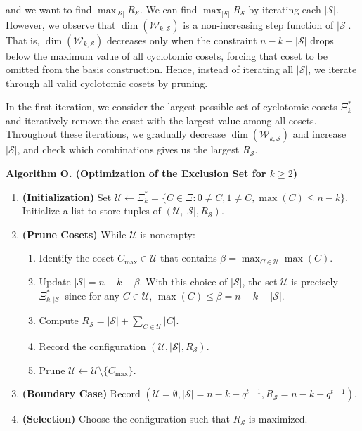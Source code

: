 \documentclass[onecolumn]{IEEEtran}
\theoremstyle{plain}
\theoremstyle{definition}
\newcommand{\cS}{\mathcal{S}}
\newcommand{\cU}{\mathcal{U}}
\newcommand{\cW}{\mathcal{W}}
\begin{document}
and we want to find $\max_{|\cS|} R_\cS$. We can find $\max_{|\cS|} R_\cS$ by iterating each $|\cS|$. However, we observe that $\dim(\cW_{k,\cS})$ is a non-increasing step function of $|\cS|$. That is, $\dim{(\cW_{k,\cS})}$ decreases only when the constraint $n-k-|\cS|$ drops below the maximum value of all cyclotomic cosets, forcing that coset to be omitted from the basis construction. Hence, instead of iterating all $|\cS|$, we iterate through all valid cyclotomic cosets by pruning. 

In the first iteration, we consider the largest possible set of cyclotomic cosets $\Xi^*_k$ and iteratively remove the coset with the largest value among all cosets. Throughout these iterations, we gradually decrease $\dim(\cW_{k,\cS})$ and increase $|\cS|$, and check which combinations gives us the largest $R_\cS$.

\noindent \textbf{Algorithm O. (Optimization of the Exclusion Set for $k\ge 2$)}
\begin{enumerate}[label=\textbf{O\arabic*.}, leftmargin=*, labelsep=0.5em]
    \item \textbf{(Initialization)} Set $\cU\leftarrow\Xi_k^* = \{C\in\Xi:0\ne C, 1 \ne C, \max(C)\le n-k\}$. Initialize a list to store tuples of $(\cU, |\cS|, R_{\cS})$.
    \item \textbf{(Prune Cosets)} While $\cU$ is nonempty:
    \begin{enumerate}[label = \arabic*.]
        \item Identify the coset $C_{\text{max}}\in\cU$ that contains $\beta = \max_{C\in\cU}\max(C)$.
        \item Update $|\cS| = n-k-\beta$. With this choice of $|\cS|$, the set $\cU$ is precisely $\Xi_{k,|\cS|}^*$ since for any $C\in\cU$, $\max(C)\le \beta = n - k - |\cS|$. 
        \item Compute $R_{\cS} = |\cS| + \sum_{C\in\cU}|C|$.
        \item Record the configuration $(\cU,|\cS|, R_{\cS})$.
        \item Prune $\cU \leftarrow \cU \setminus \{C_\text{max}\}$.
    \end{enumerate}
    \item \textbf{(Boundary Case)} Record $(\cU = \emptyset, |\cS| = n-k-q^{t-1},R_\cS = n-k-q^{t-1})$.
    \item \textbf{(Selection)} Choose the configuration such that $R_\cS$ is maximized.
\end{enumerate}
\end{document}
